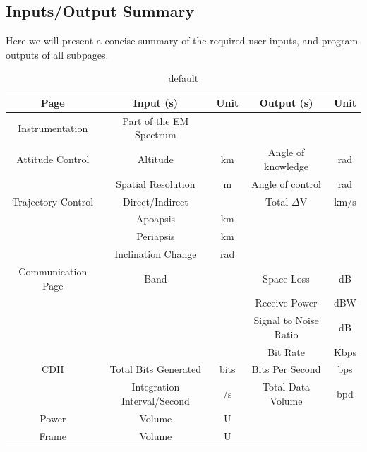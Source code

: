 \documentclass[a4, 12 pt]{article} %
\begin{document}
\subsection{Inputs/Output Summary}
Here we will present a concise summary of the required user inputs, and program outputs of all subpages.
\begin{table}[H]
\caption{default}
\begin{center}
\begin{tabular}{|c|c|c|c|c|}
\hline
Page & Input (s) & Unit& Output (s) & Unit\\
\hline
Instrumentation & Part of the EM Spectrum & & & \\
\hline
Attitude Control & Altitude&km & Angle of knowledge& rad\\
 &Spatial Resolution &m &Angle of control & rad\\
\hline
Trajectory Control & Direct/Indirect  & &Total $\Delta$V& km/s\\
& Apoapsis  & km& & \\
& Periapsis  & km& & \\
& Inclination Change  &rad & & \\
\hline
Communication Page & Band & & Space Loss & dB \\
 & & & Receive Power &dBW\\
 & & & Signal to Noise Ratio &dB\\
 & & & Bit Rate &Kbps\\
\hline
CDH & Total Bits Generated&bits &Bits Per Second &bps\\
&Integration Interval/Second & /s &Total Data Volume & bpd\\
\hline
Power & Volume &U & & \\
\hline
Frame & Volume& U& &  \\
\hline
\end{tabular}
\end{center}
\label{default}
\end{table}%
\end{document}
